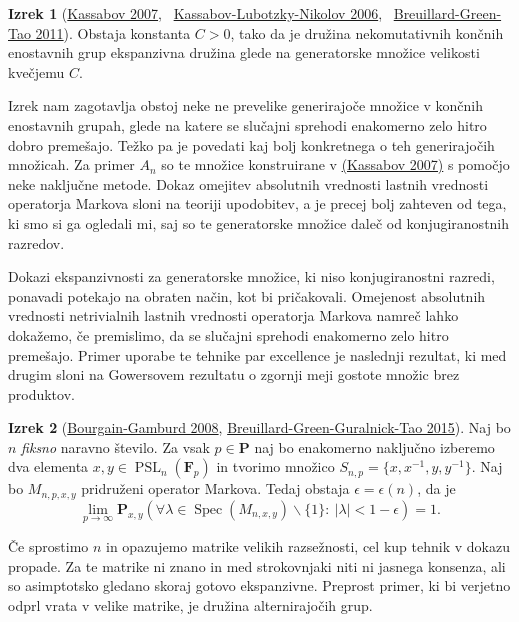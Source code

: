 \documentclass[11pt]{book}
\def\FF{\mathbf{F}}
\def\PP{\mathbf{P}}
\DeclareMathOperator\Eigenvalues{Spec}
\DeclareMathOperator\PSL{PSL}
\theoremstyle{definition}
\theoremstyle{zgled}
\theoremstyle{odprtproblem}
\theoremstyle{domacanaloga}
\theoremstyle{izrek}
\newtheorem*{izrek}{Izrek}
\begin{document}
\begin{izrek}[\href{https://link.springer.com/article/10.1007/s00222-007-0065-y}{Kassabov 2007}, \ \href{https://www.pnas.org/doi/abs/10.1073/pnas.0510337103}{Kassabov-Lubotzky-Nikolov 2006}, \ \href{https://terrytao.wordpress.com/2010/05/06/suzuki-groups-as-expanders/}{Breuillard-Green-Tao 2011}]
Obstaja konstanta $C > 0$, tako da je družina nekomutativnih končnih enostavnih grup ekspanzivna družina glede na generatorske množice velikosti kvečjemu $C$.
\end{izrek}

Izrek nam zagotavlja obstoj neke ne prevelike generirajoče množice v končnih enostavnih grupah, glede na katere se slučajni sprehodi enakomerno zelo hitro dobro premešajo. Težko pa je povedati kaj bolj konkretnega o teh generirajočih množicah. Za primer $A_n$ so te množice konstruirane v \href{https://link.springer.com/article/10.1007/s00222-007-0065-y}{(Kassabov 2007)} s pomočjo neke naključne metode. Dokaz omejitev absolutnih vrednosti lastnih vrednosti operatorja Markova sloni na teoriji upodobitev, a je precej bolj zahteven od tega, ki smo si ga ogledali mi, saj so te generatorske množice daleč od konjugiranostnih razredov.

Dokazi ekspanzivnosti za generatorske množice, ki niso konjugiranostni razredi, ponavadi potekajo na obraten način, kot bi pričakovali. Omejenost absolutnih vrednosti netrivialnih lastnih vrednosti operatorja Markova namreč lahko dokažemo, če premislimo, da se slučajni sprehodi enakomerno zelo hitro premešajo. Primer uporabe te tehnike par excellence je naslednji rezultat, ki med drugim sloni na Gowersovem rezultatu o zgornji meji gostote množic brez produktov.

\begin{izrek}[\href{https://annals.math.princeton.edu/2008/167-2/p07}{Bourgain-Gamburd 2008}, \href{https://ems.press/journals/jems/articles/12498}{Breuillard-Green-Guralnick-Tao 2015}]
Naj bo $n$ \emph{fiksno} naravno število. Za vsak $p \in \PP$ naj bo enakomerno naključno izberemo dva elementa $x,y \in \PSL_n(\FF_p)$ in tvorimo množico $S_{n,p} = \{ x, x^{-1}, y, y^{-1} \}$. Naj bo $M_{n,p,x,y}$ pridruženi operator Markova. Tedaj obstaja $\epsilon = \epsilon(n)$, da je 
\[
    \lim_{p \to \infty} \PP_{x,y}(\forall \lambda \in \Eigenvalues(M_{n,x,y}) \backslash \{ 1 \} \colon \ |\lambda| < 1 - \epsilon) = 1.
\]
\end{izrek}

Če sprostimo $n$ in opazujemo matrike velikih razsežnosti, cel kup tehnik v dokazu propade. Za te matrike ni znano in med strokovnjaki niti ni jasnega konsenza, ali so asimptotsko gledano skoraj gotovo ekspanzivne. Preprost primer, ki bi verjetno odprl vrata v velike matrike, je družina alternirajočih grup.
\end{document}

